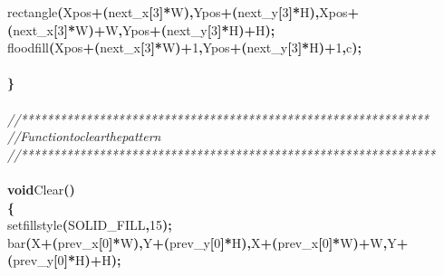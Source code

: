 \documentclass[a4paper, 10pt]{article}
\newcommand\SPC{\hspace*{0.6em}}
\newcommand{\CppAComment}[1]{\textit{\textcolor[rgb]{0.2,0.6,1}{#1}}}
\newcommand{\CppAIdentifier}[1]{#1}
\newcommand{\CppANumber}[1]{\textcolor[rgb]{0.5,0,0.5}{#1}}
\newcommand{\CppAReservedWord}[1]{\textbf{#1}}
\newcommand{\CppASpace}[1]{\colorbox[rgb]{1,1,1}{#1}}
\newcommand{\CppASymbol}[1]{\textbf{\textcolor[rgb]{1,0,0}{#1}}}
\begin{document}
\begin{ttfamily}
\CppASpace{\SPC }\CppAIdentifier{rectangle}\CppASymbol{(}\CppAIdentifier{Xpos}\CppASymbol{+}\CppASymbol{(}\CppAIdentifier{next\_x}\CppASymbol{[}\CppANumber{3}\CppASymbol{]}\CppASymbol{*}\CppAIdentifier{W}\CppASymbol{)}\CppASymbol{,}\CppAIdentifier{Ypos}\CppASymbol{+}\CppASymbol{(}\CppAIdentifier{next\_y}\CppASymbol{[}\CppANumber{3}\CppASymbol{]}\CppASymbol{*}\CppAIdentifier{H}\CppASymbol{)}\CppASymbol{,}\CppAIdentifier{Xpos}\CppASymbol{+}\CppASymbol{(}\CppAIdentifier{next\_x}\CppASymbol{[}\CppANumber{3}\CppASymbol{]}\CppASymbol{*}\CppAIdentifier{W}\CppASymbol{)}\CppASymbol{+}\CppAIdentifier{W}\CppASymbol{,}\CppAIdentifier{Ypos}\CppASymbol{+}\CppASymbol{(}\CppAIdentifier{next\_y}\CppASymbol{[}\CppANumber{3}\CppASymbol{]}\CppASymbol{*}\CppAIdentifier{H}\CppASymbol{)}\CppASymbol{+}\CppAIdentifier{H}\CppASymbol{)}\CppASymbol{;}\\
\CppASpace{\SPC }\CppAIdentifier{floodfill}\CppASymbol{(}\CppAIdentifier{Xpos}\CppASymbol{+}\CppASymbol{(}\CppAIdentifier{next\_x}\CppASymbol{[}\CppANumber{3}\CppASymbol{]}\CppASymbol{*}\CppAIdentifier{W}\CppASymbol{)}\CppASymbol{+}\CppANumber{1}\CppASymbol{,}\CppAIdentifier{Ypos}\CppASymbol{+}\CppASymbol{(}\CppAIdentifier{next\_y}\CppASymbol{[}\CppANumber{3}\CppASymbol{]}\CppASymbol{*}\CppAIdentifier{H}\CppASymbol{)}\CppASymbol{+}\CppANumber{1}\CppASymbol{,}\CppAIdentifier{c}\CppASymbol{)}\CppASymbol{;}\\
\\
\CppASymbol{\}}\\
\\
\CppAComment{//***************************************************************}\\
\CppAComment{//\SPC \SPC \SPC \SPC \SPC \SPC Function\SPC to\SPC clear\SPC the\SPC pattern}\\
\CppAComment{//****************************************************************}\\
\\
\CppAReservedWord{void}\CppASpace{\SPC }\CppAIdentifier{Clear}\CppASymbol{(}\CppASymbol{)}\\
\CppASymbol{\{}\\
\CppASpace{\SPC }\CppAIdentifier{setfillstyle}\CppASymbol{(}\CppAIdentifier{SOLID\_FILL}\CppASymbol{,}\CppANumber{15}\CppASymbol{)}\CppASymbol{;}\\
\CppASpace{\SPC }\CppAIdentifier{bar}\CppASymbol{(}\CppAIdentifier{X}\CppASymbol{+}\CppASymbol{(}\CppAIdentifier{prev\_x}\CppASymbol{[}\CppANumber{0}\CppASymbol{]}\CppASymbol{*}\CppAIdentifier{W}\CppASymbol{)}\CppASymbol{,}\CppAIdentifier{Y}\CppASymbol{+}\CppASymbol{(}\CppAIdentifier{prev\_y}\CppASymbol{[}\CppANumber{0}\CppASymbol{]}\CppASymbol{*}\CppAIdentifier{H}\CppASymbol{)}\CppASymbol{,}\CppAIdentifier{X}\CppASymbol{+}\CppASymbol{(}\CppAIdentifier{prev\_x}\CppASymbol{[}\CppANumber{0}\CppASymbol{]}\CppASymbol{*}\CppAIdentifier{W}\CppASymbol{)}\CppASymbol{+}\CppAIdentifier{W}\CppASymbol{,}\CppAIdentifier{Y}\CppASymbol{+}\CppASymbol{(}\CppAIdentifier{prev\_y}\CppASymbol{[}\CppANumber{0}\CppASymbol{]}\CppASymbol{*}\CppAIdentifier{H}\CppASymbol{)}\CppASymbol{+}\CppAIdentifier{H}\CppASymbol{)}\CppASymbol{;}\\

\end{ttfamily}
\end{document}
